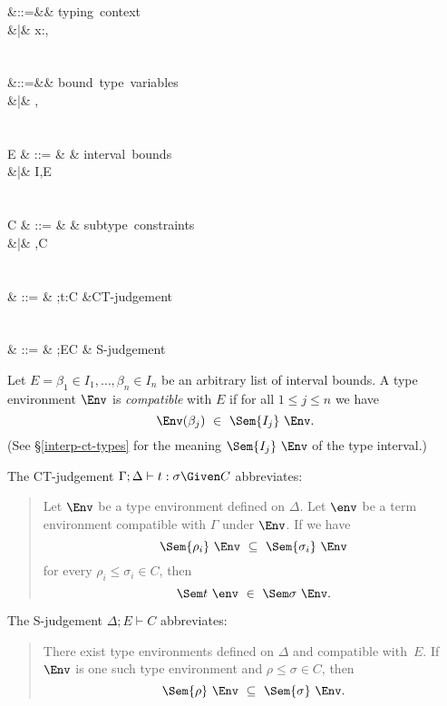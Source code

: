 \documentclass{amsart}
\begin{document}
\begin{syntax}
\Gamma &::=&\emptyset& \mbox{typing context}\\
&|& x:\sigma,\Gamma\\
\\\\
\Delta &::=&\emptyset& \mbox{bound type variables}\\
&|& \alpha,\Delta\\
\\\\
E & ::= & \emptyset & \mbox{interval bounds}\\
&|& \alpha\in I,E\\
\\\\
C & ::= & \emptyset & \mbox{subtype constraints}\\
&|& \rho\le\sigma,C\\
\\\\
\JCT & ::= & \Gamma;\Delta\vdash t:\sigma\Given C
&\mbox{CT-judgement}\\
\\\\
\JS & ::= & \Delta;E\vdash C & \mbox{S-judgement}
\end{syntax}


Let $E=\beta_1\in I_1,\ldots,\beta_n\in I_n$ be an arbitrary list
of interval bounds. A type environment $\Env$ is
\emph{compatible} with $E$ if for all $1\le j\le n$ we have
\[
\Env(\beta_j)\ \in\ \Sem{I_j}~\Env.
\]
(See \S\ref{interp-ct-types} for the meaning $\Sem{I_j}~\Env$ of
the type interval.)

\begin{samepage}
The CT-judgement $\Gamma;\Delta\vdash t:\sigma\Given C$
abbreviates:
\begin{quotation}
Let $\Env$ be a type environment defined on $\Delta$. Let $\env$
be a term environment compatible with $\Gamma$ under $\Env$.
%
If we have
\[
\Sem{\rho_i}~\Env\ \subseteq\ \Sem{\sigma_i}~\Env
\]
for every $\rho_i\le\sigma_i\in C$, then
\[
\Sem t~\env\ \in\ \Sem\sigma~\Env.
\]
\end{quotation}
\end{samepage}

The S-judgement $\Delta;E\vdash C$ abbreviates:
\begin{quotation}
There exist type environments defined on $\Delta$ and compatible
with~$E$. If $\Env$ is one such type environment and
$\rho\le\sigma\in C$, then
\[
\Sem{\rho}~\Env\ \subseteq\ \Sem{\sigma}~\Env.
\]
\end{quotation}
\end{document}
